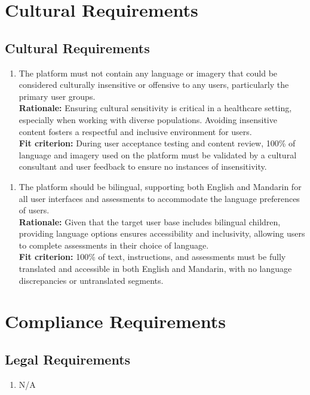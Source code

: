 \documentclass[12pt]{article}
\begin{document}
\section{Cultural Requirements}
\subsection{Cultural Requirements}
\begin{enumerate}[{CU-CR}1. ]
  \item The platform must not contain any language or imagery that could be considered culturally insensitive or offensive to any users, particularly the primary user groups.\\
  \textbf{Rationale: }Ensuring cultural sensitivity is critical in a healthcare setting, especially when working with diverse populations. Avoiding insensitive content fosters a respectful and inclusive environment 
  for users.\\
  \textbf{Fit criterion: }During user acceptance testing and content review, 100\% of language and imagery used on the platform must be validated by a cultural consultant and user feedback to ensure no instances of 
  insensitivity.
\end{enumerate}
\begin{enumerate}[{CU-CR}2. ]
  \item The platform should be bilingual, supporting both English and Mandarin for all user interfaces and assessments to accommodate the language preferences of users.\\
  \textbf{Rationale: }Given that the target user base includes bilingual children, providing language options ensures accessibility and inclusivity, allowing users to complete assessments in their choice of language.\\
  \textbf{Fit criterion: }100\% of text, instructions, and assessments must be fully translated and accessible in both English and Mandarin, with no language discrepancies or untranslated segments.  
\end{enumerate}

\section{Compliance Requirements}
\subsection{Legal Requirements}
\begin{enumerate}[{CR-LR}1. ]
  \item N/A
\end{enumerate}
\end{document}
